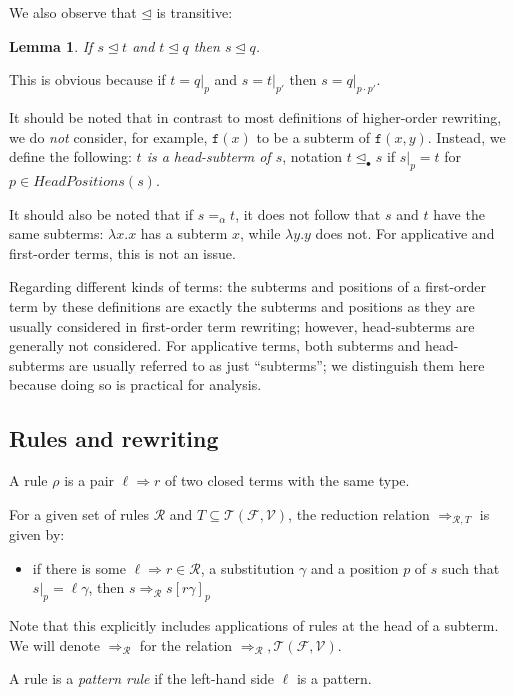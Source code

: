 \documentclass{lmcs}
\theoremstyle{theorem}\newtheorem{theorem}{Theorem}
\theoremstyle{theorem}\newtheorem{lemma}[theorem]{Lemma}
\theoremstyle{theorem}\newtheorem{corollary}[theorem]{Corollary}
\theoremstyle{definition}\newtheorem{definition}[theorem]{Definition}
\theoremstyle{definition}\newtheorem{example}[theorem]{Example}
\newcommand{\F}{\mathcal{F}}
\newcommand{\V}{\mathcal{V}}
\newcommand{\Terms}{\mathcal{T}}
\newcommand{\Rules}{\mathcal{R}}
\newcommand{\HeadPositions}{\mathit{HeadPositions}}
\newcommand{\identifier}[1]{\mathtt{#1}}
\newcommand{\afun}{\identifier{f}}
\newcommand{\abs}[2]{\lambda #1.#2}
\newcommand{\arrz}{\Rightarrow}
\newcommand{\arr}[1]{\arrz_{#1}}
\newcommand{\subtermeq}{\unlhd}
\newcommand{\headsubtermeq}{\unlhd_{\bullet}}
\begin{document}
We also observe that $\subtermeq$ is transitive:

\begin{lemma}
If $s \subtermeq t$ and $t \subtermeq q$ then $s \subtermeq q$.
\end{lemma}

This is obvious because if $t = q|_p$ and $s = t|_{p'}$ then $s = q|_{p \cdot p'}$.

It should be noted that in contrast to most definitions of higher-order rewriting, we do \emph{not}
consider, for example, $\afun(x)$ to be a subterm of $\afun(x,y)$.  Instead, we define the
following: \emph{$t$ is a head-subterm of $s$}, notation $t \headsubtermeq s$ if $s|_p = t$ for
$p \in \HeadPositions(s)$.

It should also be noted that if $s =_\alpha t$, it does not follow that $s$ and $t$ have the same
subterms: $\abs{x}{x}$ has a subterm $x$, while $\abs{y}{y}$ does not.  For applicative and
first-order terms, this is not an issue.

Regarding different kinds of terms: the subterms and positions of a first-order term by these
definitions are exactly the subterms and positions as they are usually considered in first-order
term rewriting; however, head-subterms are generally not considered.  For applicative terms,
both subterms and head-subterms are usually referred to as just ``subterms''; we distinguish them
here because doing so is practical for analysis.

\subsection{Rules and rewriting}

A rule $\rho$ is a pair $\ell \arrz r$ of two closed terms with the same type.

For a given set of rules $\Rules$ and $T \subseteq \Terms(\F,\V)$, the reduction relation
$\arr{\Rules,T}$ is given by:
\begin{itemize}
\item if there is some $\ell \arrz r \in \Rules$, a substitution $\gamma$ and a position $p$ of
  $s$ such that $s|_p = \ell\gamma$, then $s \arr{\Rules} s[r\gamma]_p$
\end{itemize}

\medskip
Note that this explicitly includes applications of rules at the head of a subterm.
We will denote $\arr{\Rules}$ for the relation $\arr{\Rules},\Terms(\F,\V)$.

A rule is a \emph{pattern rule} if the left-hand side $\ell$ is a pattern.
\end{document}
